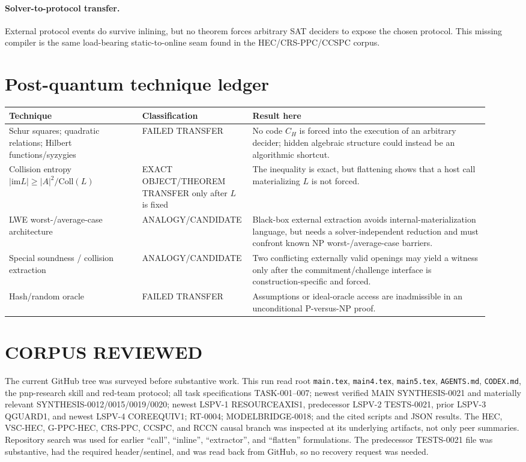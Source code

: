 \documentclass[11pt]{article}
\begin{document}
\paragraph{Solver-to-protocol transfer.}
External protocol events do survive inlining, but no theorem forces arbitrary
SAT deciders to expose the chosen protocol.  This missing compiler is the same
load-bearing static-to-online seam found in the HEC/CRS-PPC/CCSPC corpus.

\section{Post-quantum technique ledger}
\begin{tabular}{p{0.27\linewidth}p{0.18\linewidth}p{0.48\linewidth}}
\toprule
Technique & Classification & Result here\\
\midrule
Schur squares; quadratic relations; Hilbert functions/syzygies
& FAILED TRANSFER & No code $C_H$ is forced into the execution of an arbitrary decider; hidden algebraic structure could instead be an algorithmic shortcut.\\
Collision entropy $|\mathrm{im}L|\ge |A|^2/\mathrm{Coll}(L)$
& EXACT OBJECT/THEOREM TRANSFER only after $L$ is fixed & The inequality is exact, but flattening shows that a host call materializing $L$ is not forced.\\
LWE worst-/average-case architecture
& ANALOGY/CANDIDATE & Black-box external extraction avoids internal-materialization language, but needs a solver-independent reduction and must confront known NP worst-/average-case barriers.\\
Special soundness / collision extraction
& ANALOGY/CANDIDATE & Two conflicting externally valid openings may yield a witness only after the commitment/challenge interface is construction-specific and forced.\\
Hash/random oracle
& FAILED TRANSFER & Assumptions or ideal-oracle access are inadmissible in an unconditional P-versus-NP proof.\\
\bottomrule
\end{tabular}

\section{CORPUS REVIEWED}
The current GitHub tree was surveyed before substantive work.  This run read
root \texttt{main.tex}, \texttt{main4.tex}, \texttt{main5.tex},
\texttt{AGENTS.md}, \texttt{CODEX.md}, the pnp-research skill and red-team
protocol; all task specifications TASK-001--007; newest verified MAIN
SYNTHESIS-0021 and materially relevant SYNTHESIS-0012/0015/0019/0020; newest
LSPV-1 RESOURCEAXIS1, predecessor LSPV-2 TESTS-0021, prior LSPV-3 QGUARD1,
and newest LSPV-4 COREEQUIV1; RT-0004; MODELBRIDGE-0018; and the cited scripts
and JSON results.  The HEC, VSC-HEC, G-PPC-HEC, CRS-PPC, CCSPC, and RCCN
causal branch was inspected at its underlying artifacts, not only peer
summaries.  Repository search was used for earlier ``call'', ``inline'',
``extractor'', and ``flatten'' formulations.  The predecessor TESTS-0021 file
was substantive, had the required header/sentinel, and was read back from
GitHub, so no recovery request was needed.
\end{document}
